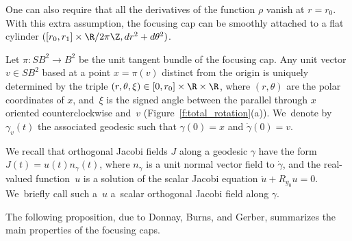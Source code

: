 \begin{Remark}\label{r:attach_cap}
One can also require that all the derivatives of the function $\rho$ vanish at $r=r_0$. With this extra assumption, the focusing cap can be smoothly attached to a flat cylinder $([r_0,r_1]\times\R/2\pi\Z,dr^2+d\theta^2)$.
\end{Remark}

Let $\pi:SB^2\to B^2$ be the unit tangent bundle of the focusing cap. Any unit vector $v\in SB^2$ based at a point $x=\pi(v)$ distinct from the origin is uniquely determined by the triple $(r,\theta,\xi)\in[0,r_0]\times\R\times\R$, where $(r,\theta)$ are the polar coordinates of $x$, and~$\xi$ is the signed angle between the parallel through $x$ oriented counterclockwise and~$v$ (Figure~\ref{f:total_rotation}(a)). We~denote by $\gamma_v(t)$ the associated geodesic such that $\gamma(0)=x$ and $\dot\gamma(0)=v$.

We recall that orthogonal Jacobi fields $J$ along a geodesic $\gamma$ have the form $J(t)=u(t)n_\gamma(t)$, where $n_\gamma$ is a unit normal vector field to $\dot\gamma$, and the real-valued function~$u$ is a solution of the scalar Jacobi equation $\ddot u+R_{g_0} u=0$. We~briefly call such a~$u$ a~scalar orthogonal Jacobi field along $\gamma$.

The following proposition, due to Donnay, Burns, and Gerber, summarizes the main properties of the focusing caps.

